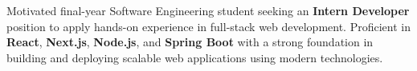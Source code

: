 Motivated final-year Software Engineering student seeking an \textbf{Intern Developer} position to apply hands-on experience in full-stack web development. Proficient in \textbf{React}, \textbf{Next.js}, \textbf{Node.js}, and \textbf{Spring Boot} with a strong foundation in building and deploying scalable web applications using modern technologies.
